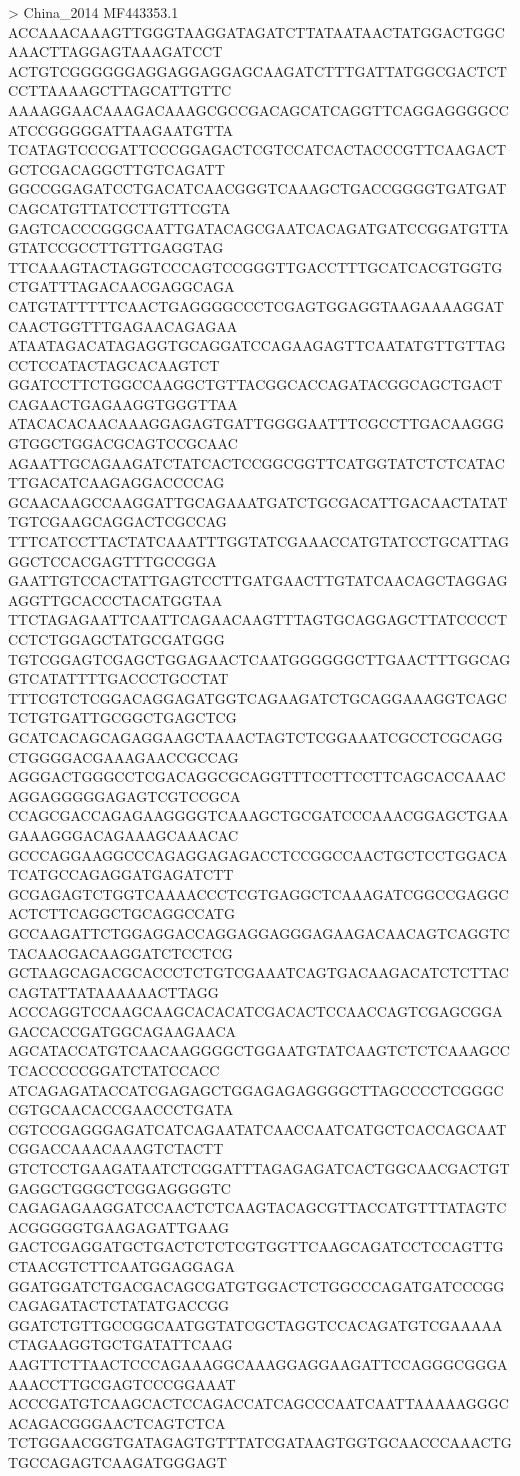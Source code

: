 > China_2014 MF443353.1
ACCAAACAAAGTTGGGTAAGGATAGATCTTATAATAACTATGGACTGGCAAACTTAGGAGTAAAGATCCT
ACTGTCGGGGGGAGGAGGAGGAGCAAGATCTTTGATTATGGCGACTCTCCTTAAAAGCTTAGCATTGTTC
AAAAGGAACAAAGACAAAGCGCCGACAGCATCAGGTTCAGGAGGGGCCATCCGGGGGATTAAGAATGTTA
TCATAGTCCCGATTCCCGGAGACTCGTCCATCACTACCCGTTCAAGACTGCTCGACAGGCTTGTCAGATT
GGCCGGAGATCCTGACATCAACGGGTCAAAGCTGACCGGGGTGATGATCAGCATGTTATCCTTGTTCGTA
GAGTCACCCGGGCAATTGATACAGCGAATCACAGATGATCCGGATGTTAGTATCCGCCTTGTTGAGGTAG
TTCAAAGTACTAGGTCCCAGTCCGGGTTGACCTTTGCATCACGTGGTGCTGATTTAGACAACGAGGCAGA
CATGTATTTTTCAACTGAGGGGCCCTCGAGTGGAGGTAAGAAAAGGATCAACTGGTTTGAGAACAGAGAA
ATAATAGACATAGAGGTGCAGGATCCAGAAGAGTTCAATATGTTGTTAGCCTCCATACTAGCACAAGTCT
GGATCCTTCTGGCCAAGGCTGTTACGGCACCAGATACGGCAGCTGACTCAGAACTGAGAAGGTGGGTTAA
ATACACACAACAAAGGAGAGTGATTGGGGAATTTCGCCTTGACAAGGGGTGGCTGGACGCAGTCCGCAAC
AGAATTGCAGAAGATCTATCACTCCGGCGGTTCATGGTATCTCTCATACTTGACATCAAGAGGACCCCAG
GCAACAAGCCAAGGATTGCAGAAATGATCTGCGACATTGACAACTATATTGTCGAAGCAGGACTCGCCAG
TTTCATCCTTACTATCAAATTTGGTATCGAAACCATGTATCCTGCATTAGGGCTCCACGAGTTTGCCGGA
GAATTGTCCACTATTGAGTCCTTGATGAACTTGTATCAACAGCTAGGAGAGGTTGCACCCTACATGGTAA
TTCTAGAGAATTCAATTCAGAACAAGTTTAGTGCAGGAGCTTATCCCCTCCTCTGGAGCTATGCGATGGG
TGTCGGAGTCGAGCTGGAGAACTCAATGGGGGGCTTGAACTTTGGCAGGTCATATTTTGACCCTGCCTAT
TTTCGTCTCGGACAGGAGATGGTCAGAAGATCTGCAGGAAAGGTCAGCTCTGTGATTGCGGCTGAGCTCG
GCATCACAGCAGAGGAAGCTAAACTAGTCTCGGAAATCGCCTCGCAGGCTGGGGACGAAAGAACCGCCAG
AGGGACTGGGCCTCGACAGGCGCAGGTTTCCTTCCTTCAGCACCAAACAGGAGGGGGAGAGTCGTCCGCA
CCAGCGACCAGAGAAGGGGTCAAAGCTGCGATCCCAAACGGAGCTGAAGAAAGGGACAGAAAGCAAACAC
GCCCAGGAAGGCCCAGAGGAGAGACCTCCGGCCAACTGCTCCTGGACATCATGCCAGAGGATGAGATCTT
GCGAGAGTCTGGTCAAAACCCTCGTGAGGCTCAAAGATCGGCCGAGGCACTCTTCAGGCTGCAGGCCATG
GCCAAGATTCTGGAGGACCAGGAGGAGGGAGAAGACAACAGTCAGGTCTACAACGACAAGGATCTCCTCG
GCTAAGCAGACGCACCCTCTGTCGAAATCAGTGACAAGACATCTCTTACCAGTATTATAAAAAACTTAGG
ACCCAGGTCCAAGCAAGCACACATCGACACTCCAACCAGTCGAGCGGAGACCACCGATGGCAGAAGAACA
AGCATACCATGTCAACAAGGGGCTGGAATGTATCAAGTCTCTCAAAGCCTCACCCCCGGATCTATCCACC
ATCAGAGATACCATCGAGAGCTGGAGAGAGGGGCTTAGCCCCTCGGGCCGTGCAACACCGAACCCTGATA
CGTCCGAGGGAGATCATCAGAATATCAACCAATCATGCTCACCAGCAATCGGACCAAACAAAGTCTACTT
GTCTCCTGAAGATAATCTCGGATTTAGAGAGATCACTGGCAACGACTGTGAGGCTGGGCTCGGAGGGGTC
CAGAGAGAAGGATCCAACTCTCAAGTACAGCGTTACCATGTTTATAGTCACGGGGGTGAAGAGATTGAAG
GACTCGAGGATGCTGACTCTCTCGTGGTTCAAGCAGATCCTCCAGTTGCTAACGTCTTCAATGGAGGAGA
GGATGGATCTGACGACAGCGATGTGGACTCTGGCCCAGATGATCCCGGCAGAGATACTCTATATGACCGG
GGATCTGTTGCCGGCAATGGTATCGCTAGGTCCACAGATGTCGAAAAACTAGAAGGTGCTGATATTCAAG
AAGTTCTTAACTCCCAGAAAGGCAAAGGAGGAAGATTCCAGGGCGGGAAAACCTTGCGAGTCCCGGAAAT
ACCCGATGTCAAGCACTCCAGACCATCAGCCCAATCAATTAAAAAGGGCACAGACGGGAACTCAGTCTCA
TCTGGAACGGTGATAGAGTGTTTATCGATAAGTGGTGCAACCCAAACTGTGCCAGAGTCAAGATGGGAGT
